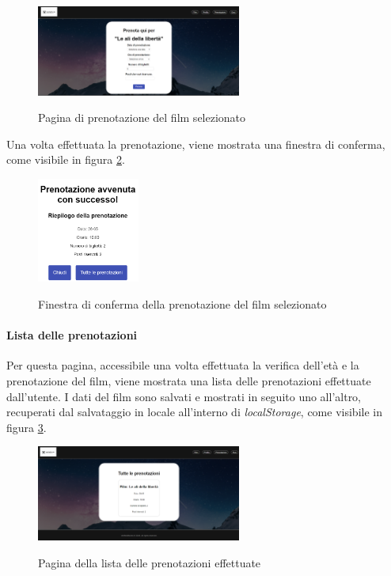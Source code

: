 \begin{figure}[h]
    \centering
    \includegraphics[width=0.6\textwidth, alt={Schermata della pagina di prenotazione del film selezionato}]{immagini/frontend/movie-booking.png}
    \caption{Pagina di prenotazione del film selezionato}\label{fig:prenotazione-film}
\end{figure}

\newpage

Una volta effettuata la prenotazione, viene mostrata una finestra di conferma, come visibile in figura \ref{fig:conferma-prenotazione}.
\begin{figure}[h]
    \centering
    \includegraphics[width=0.3\textwidth, alt={Schermata della pagina di conferma della prenotazione del film selezionato}]{immagini/frontend/movie-booking-done.png}
    \caption{Finestra di conferma della prenotazione del film selezionato}\label{fig:conferma-prenotazione}
\end{figure}

\paragraph{Lista delle prenotazioni}
Per questa pagina, accessibile una volta effettuata la verifica dell'età e la prenotazione del film, viene mostrata una lista delle prenotazioni effettuate dall'utente.
I dati del film sono salvati e mostrati in seguito uno all'altro, recuperati dal salvataggio in locale all'interno di \textit{localStorage}, come visibile in figura \ref{fig:lista-prenotazioni}.

\begin{figure}[h]
    \centering
    \includegraphics[width=0.6\textwidth, alt={Schermata della pagina di lista delle prenotazioni effettuate}]{immagini/frontend/movie-booking-list.png}
    \caption{Pagina della lista delle prenotazioni effettuate}\label{fig:lista-prenotazioni}
\end{figure}

